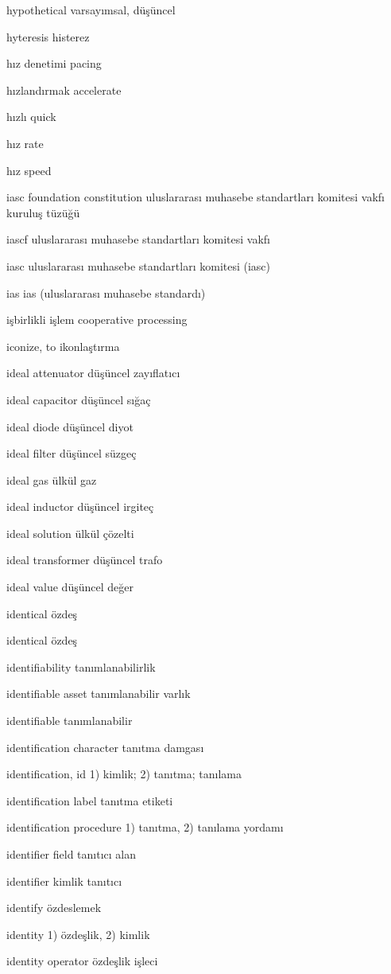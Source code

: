 \documentclass[12pt,fleqn]{article}\usepackage{../../common}
\begin{document}
hypothetical varsayımsal, düşüncel

hyteresis histerez

hız denetimi pacing

hızlandırmak accelerate

hızlı quick

hız rate

hız speed

iasc foundation constitution uluslararası muhasebe standartları komitesi vakfı kuruluş tüzüğü

iascf uluslararası muhasebe standartları komitesi vakfı

iasc uluslararası muhasebe standartları komitesi (iasc)

ias ias (uluslararası muhasebe standardı)

işbirlikli işlem cooperative processing

iconize, to ikonlaştırma

ideal attenuator düşüncel zayıflatıcı

ideal capacitor düşüncel sığaç

ideal diode düşüncel diyot

ideal filter düşüncel süzgeç

ideal gas ülkül gaz

ideal inductor düşüncel irgiteç

ideal solution ülkül çözelti

ideal transformer düşüncel trafo

ideal value düşüncel değer

identical özdeş

identical özdeş

identifiability tanımlanabilirlik

identifiable asset tanımlanabilir varlık

identifiable tanımlanabilir

identification character tanıtma damgası

identification, id 1) kimlik; 2) tanıtma; tanılama

identification label tanıtma etiketi

identification procedure 1) tanıtma, 2) tanılama yordamı

identifier field tanıtıcı alan

identifier kimlik tanıtıcı

identify özdeslemek

identity 1) özdeşlik, 2) kimlik

identity operator özdeşlik işleci
\end{document}
